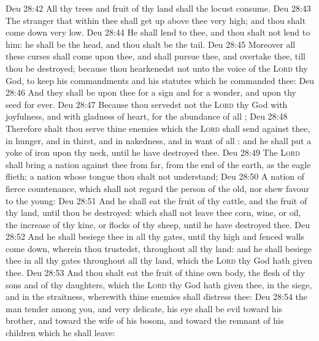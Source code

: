 \vs Deu 28:42 All thy trees and fruit of thy land shall the locust consume.
\vs Deu 28:43 The stranger that  within thee shall get up above thee very high; and thou shalt come down very low.
\vs Deu 28:44 He shall lend to thee, and thou shalt not lend to him: he shall be the head, and thou shalt be the tail.
\vs Deu 28:45 Moreover all these curses shall come upon thee, and shall pursue thee, and overtake thee, till thou be destroyed; because thou hearkenedst not unto the voice of the \textsc{Lord} thy God, to keep his commandments and his statutes which he commanded thee:
\vs Deu 28:46 And they shall be upon thee for a sign and for a wonder, and upon thy seed for ever.
\vs Deu 28:47 Because thou servedst not the \textsc{Lord} thy God with joyfulness, and with gladness of heart, for the abundance of all ;
\vs Deu 28:48 Therefore shalt thou serve thine enemies which the \textsc{Lord} shall send against thee, in hunger, and in thirst, and in nakedness, and in want of all : and he shall put a yoke of iron upon thy neck, until he have destroyed thee.
\vs Deu 28:49 The \textsc{Lord} shall bring a nation against thee from far, from the end of the earth,  as the eagle flieth; a nation whose tongue thou shalt not understand;
\vs Deu 28:50 A nation of fierce countenance, which shall not regard the person of the old, nor shew favour to the young:
\vs Deu 28:51 And he shall eat the fruit of thy cattle, and the fruit of thy land, until thou be destroyed: which  shall not leave thee  corn, wine, or oil,  the increase of thy kine, or flocks of thy sheep, until he have destroyed thee.
\vs Deu 28:52 And he shall besiege thee in all thy gates, until thy high and fenced walls come down, wherein thou trustedst, throughout all thy land: and he shall besiege thee in all thy gates throughout all thy land, which the \textsc{Lord} thy God hath given thee.
\vs Deu 28:53 And thou shalt eat the fruit of thine own body, the flesh of thy sons and of thy daughters, which the \textsc{Lord} thy God hath given thee, in the siege, and in the straitness, wherewith thine enemies shall distress thee:
\vs Deu 28:54  the man  tender among you, and very delicate, his eye shall be evil toward his brother, and toward the wife of his bosom, and toward the remnant of his children which he shall leave:
